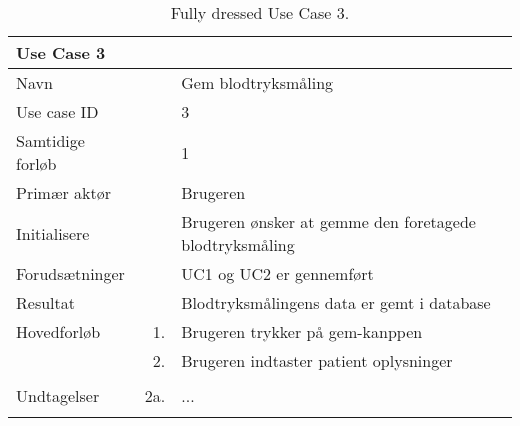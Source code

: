 \begin{longtabu} to  %
    {\large \textbf{Use Case 3}} && \\
    \toprule
    Navn &&    Gem blodtryksmåling\\
    Use case ID &&    3\\
    Samtidige forløb &&    1\\
    Primær aktør &&    Brugeren\\
    Initialisere &&    Brugeren ønsker at gemme den foretagede blodtryksmåling\\
    Forudsætninger && UC1 og UC2 er gennemført\\
    Resultat &&    Blodtryksmålingens data er gemt i database                     \\ \midrule
    Hovedforløb &    1. &    Brugeren trykker på gem\--kanppen\\[-1ex]   						 	
                &    2. &    Brugeren indtaster patient oplysninger\newline
                	[2.a \textit{...}]\\[-1ex]
                &    \\ \midrule
                
    Undtagelser &    2a. & ...    \\ \bottomrule
\caption{Fully dressed Use Case 3.}
\label{UC3}
\end{longtabu}























